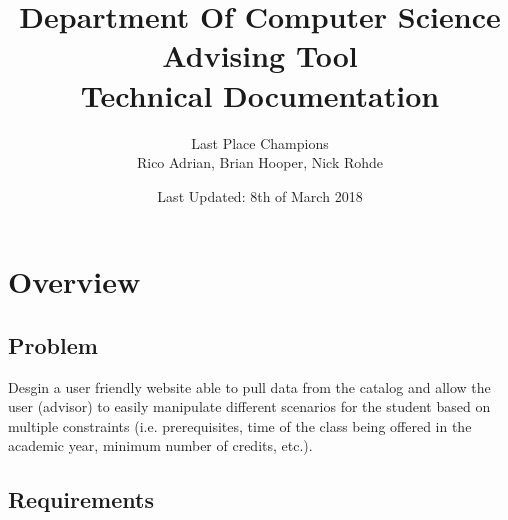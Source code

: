 \documentclass[letterpaper]{report}
\title{Department Of Computer Science Advising Tool \\ Technical Documentation}
\author{Last Place Champions \\ Rico Adrian, Brian Hooper, Nick Rohde}
\date{Last Updated: 8th of March 2018}
\begin{document}
	\maketitle
	\pagebreak
	\tableofcontents
	\pagebreak
	\chapter{Overview}
	\section{Problem}
	Desgin a user friendly website able to pull data from the catalog and allow the user (advisor) to easily manipulate different scenarios for the student based on multiple constraints (i.e. prerequisites, time of the class	being offered in the academic year, minimum number of credits, etc.).
	\section{Requirements}
\end{document}
